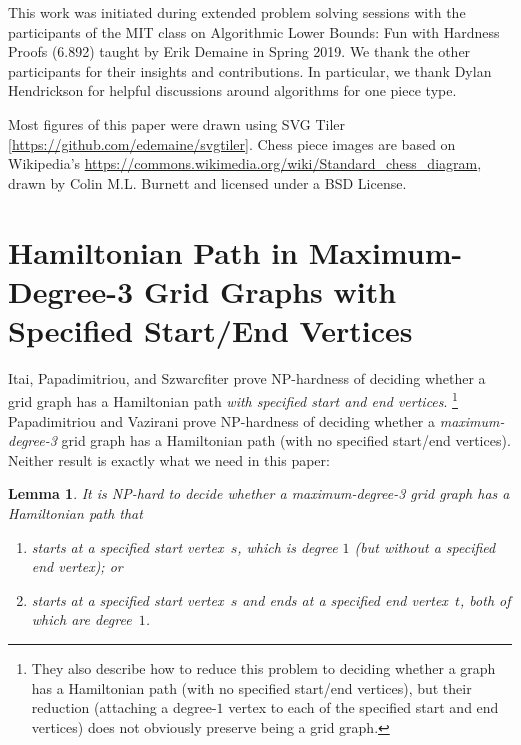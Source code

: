 \documentclass[11pt,letterpaper]{article}
\theoremstyle{plain}
\newtheorem{lemma}[theorem]{Lemma}
\theoremstyle{definition}
\theoremstyle{remark}
\numberwithin{equation}{section}
\begin{document}
This work was initiated during extended problem solving sessions
with the participants of the MIT class on
Algorithmic Lower Bounds: Fun with Hardness Proofs (6.892)
taught by Erik Demaine in Spring 2019.
We thank the other participants for their insights and contributions.
In particular, we thank Dylan Hendrickson for helpful discussions
around algorithms for one piece type.

Most figures of this paper were drawn using SVG Tiler
[\url{https://github.com/edemaine/svgtiler}].
Chess piece images are based on Wikipedia's
\url{https://commons.wikimedia.org/wiki/Standard_chess_diagram},
drawn by Colin M.L. Burnett and licensed under a BSD License.




\appendix
\section{Hamiltonian Path in Maximum-Degree-3 Grid Graphs with Specified Start/End Vertices}
\label{app:start vertex}

Itai, Papadimitriou, and Szwarcfiter \cite{GridHamPath} prove NP-hardness of
deciding whether a grid graph has a Hamiltonian path \emph{with specified
start and end vertices}.%
%
\footnote{They also describe how to reduce this problem to
  deciding whether a graph has a Hamiltonian path
  (with no specified start/end vertices), but their reduction
  (attaching a degree-$1$ vertex to each of the specified start and
  end vertices) does not obviously preserve being a grid graph.}
%
Papadimitriou and Vazirani \cite{Degree3GridHamPath} prove NP-hardness of
deciding whether a \emph{maximum-degree-3} grid graph has a Hamiltonian path
(with no specified start/end vertices).
Neither result is exactly what we need in this paper:

\begin{lemma} \label{lem:start vertex}
  It is NP-hard to decide whether a maximum-degree-3 grid graph has a
  Hamiltonian path that
  \begin{enumerate}
  \item starts at a specified start vertex~$s$, which is degree $1$
    (but without a specified end vertex); or
  \item starts at a specified start vertex~$s$
    and ends at a specified end vertex~$t$,
    both of which are degree~$1$.
  \end{enumerate}
\end{lemma}
\end{document}

